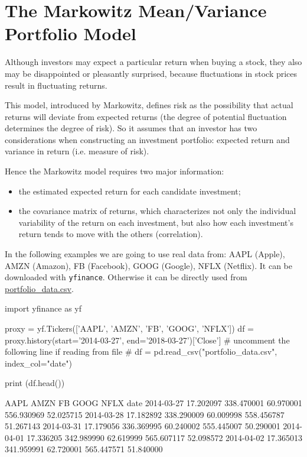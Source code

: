 \section{The Markowitz Mean/Variance Portfolio Model}
\label{the-markowitz-meanvariance-portfolio-model}

Although investors may expect a particular return when buying a stock, they also may be disappointed or pleasantly surprised, because fluctuations in stock prices result in fluctuating returns. 

This model, introduced by Markowitz, defines risk as the possibility that actual returns will deviate from expected returns (the degree of potential fluctuation determines the degree of risk).
So it assumes that an investor has two considerations when constructing an investment portfolio: expected return and variance in return (i.e. measure of risk). 

Hence the Markowitz model requires two major information:

\begin{itemize}
\tightlist
\item
  the estimated expected return for each candidate investment;
\item
  the covariance matrix of returns, which characterizes not only the individual variability of the return on each investment, but also how each investment's return tends to move with the others (correlation).
\end{itemize}

In the following examples we are going to use real data
from:  AAPL (Apple), AMZN (Amazon), FB (Facebook), GOOG (Google), NFLX (Netflix). It can be downloaded with \texttt{yfinance}. Otherwise it can be directly used from \href{https://raw.githubusercontent.com/matteosan1/finance_course/develop/libro/input_files/portfolio_data.csv}{portfolio\_data.csv}.

\begin{ipython}
import yfinance as yf

proxy = yf.Tickers(['AAPL', 'AMZN', 'FB', 'GOOG', 'NFLX'])
df = proxy.history(start='2014-03-27', end='2018-03-27')['Close']
# uncomment the following line if reading from file
# df = pd.read_csv("portfolio_data.csv", index_col="date")

print (df.head())
\end{ipython}
\begin{ioutput}
                AAPL       AMZN        FB       GOOG      NFLX
date
2014-03-27 17.202097 338.470001 60.970001 556.930969 52.025715
2014-03-28 17.182892 338.290009	60.009998 558.456787 51.267143
2014-03-31 17.179056 336.369995	60.240002 555.445007 50.290001
2014-04-01 17.336205 342.989990	62.619999 565.607117 52.098572
2014-04-02 17.365013 341.959991	62.720001 565.447571 51.840000
\end{ioutput}
 
